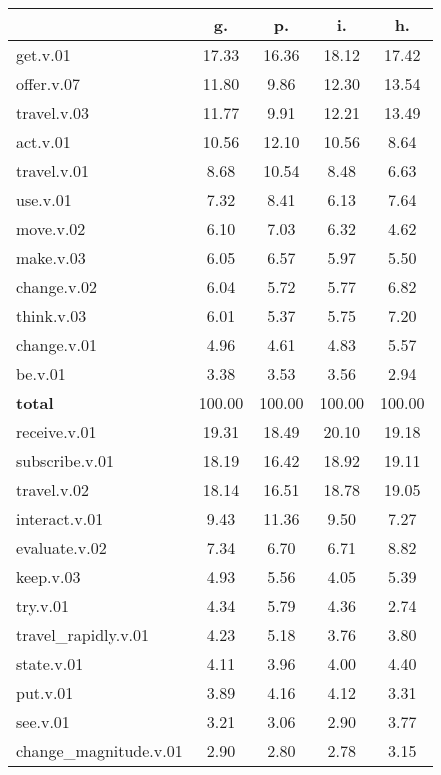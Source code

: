 \begin{table}[h!]
\begin{center}
\begin{tabular}{| l || c | c | c | c |}\hline
 & {\bf g.} & {\bf p.} & {\bf i.} & {\bf h.} \\\hline\hline
get.v.01 & 17.33  & 16.36  & 18.12  & 17.42 \\\hline
offer.v.07 & 11.80  & 9.86  & 12.30  & 13.54 \\\hline
travel.v.03 & 11.77  & 9.91  & 12.21  & 13.49 \\\hline
act.v.01 & 10.56  & 12.10  & 10.56  & 8.64 \\\hline
travel.v.01 & 8.68  & 10.54  & 8.48  & 6.63 \\\hline
use.v.01 & 7.32  & 8.41  & 6.13  & 7.64 \\\hline
move.v.02 & 6.10  & 7.03  & 6.32  & 4.62 \\\hline
make.v.03 & 6.05  & 6.57  & 5.97  & 5.50 \\\hline
change.v.02 & 6.04  & 5.72  & 5.77  & 6.82 \\\hline
think.v.03 & 6.01  & 5.37  & 5.75  & 7.20 \\\hline
change.v.01 & 4.96  & 4.61  & 4.83  & 5.57 \\\hline
be.v.01 & 3.38  & 3.53  & 3.56  & 2.94 \\\hline\hline
{{\bf total}} & 100.00  & 100.00  & 100.00  & 100.00 \\\hline\hline\hline
receive.v.01 & 19.31  & 18.49  & 20.10  & 19.18 \\\hline
subscribe.v.01 & 18.19  & 16.42  & 18.92  & 19.11 \\\hline
travel.v.02 & 18.14  & 16.51  & 18.78  & 19.05 \\\hline
interact.v.01 & 9.43  & 11.36  & 9.50  & 7.27 \\\hline
evaluate.v.02 & 7.34  & 6.70  & 6.71  & 8.82 \\\hline
keep.v.03 & 4.93  & 5.56  & 4.05  & 5.39 \\\hline
try.v.01 & 4.34  & 5.79  & 4.36  & 2.74 \\\hline
travel\_rapidly.v.01 & 4.23  & 5.18  & 3.76  & 3.80 \\\hline
state.v.01 & 4.11  & 3.96  & 4.00  & 4.40 \\\hline
put.v.01 & 3.89  & 4.16  & 4.12  & 3.31 \\\hline
see.v.01 & 3.21  & 3.06  & 2.90  & 3.77 \\\hline
change\_magnitude.v.01 & 2.90  & 2.80  & 2.78  & 3.15 \\\hline\hline

\end{tabular}
\end{center}
\end{table}
